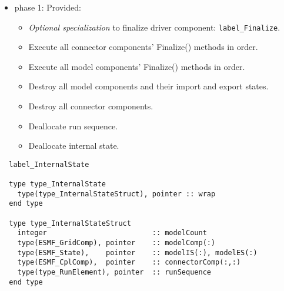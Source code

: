 \begin{itemize}
\item phase 1: {\sc Provided:}
  \begin{itemize}
  \item {\it Optional specialization} to finalize driver component: {\tt label\_Finalize}.
  \item Execute all connector components' Finalize() methods in order.
  \item Execute all model components' Finalize() methods in order.
  \item Destroy all model components and their import and export states.
  \item Destroy all connector components.
  \item Deallocate run sequence.
  \item Deallocate internal state.
  \end{itemize}      
\end{itemize}

\begin{verbatim}  label_InternalState

  type type_InternalState
    type(type_InternalStateStruct), pointer :: wrap
  end type

  type type_InternalStateStruct
    integer                         :: modelCount
    type(ESMF_GridComp), pointer    :: modelComp(:)
    type(ESMF_State),    pointer    :: modelIS(:), modelES(:)
    type(ESMF_CplComp),  pointer    :: connectorComp(:,:)
    type(type_RunElement), pointer  :: runSequence
  end type

\end{verbatim}


